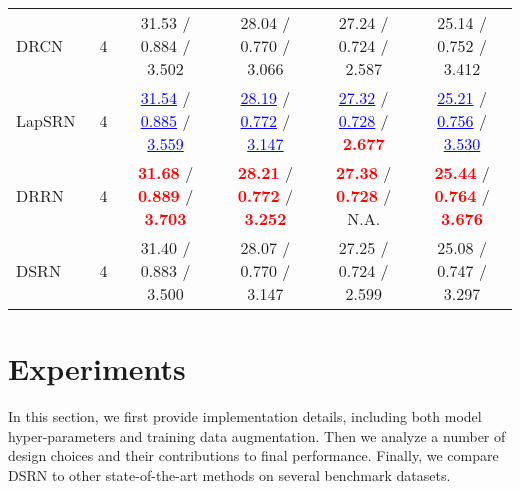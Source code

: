 \documentclass[10pt,twocolumn,letterpaper]{article}
\def\red#1{\textcolor{red}{#1}}
\def\blue#1{\textcolor{blue}{#1}}
\newcommand{\algname}{DSRN }
\begin{document}
\begin{table*}[t]
\begin{tabular}{lccccc}
DRCN~\cite{kim2016deeply}          & 4                      & 31.53 / 0.884 / 3.502                                                          & 28.04 / 0.770 / 3.066                                                          & 27.24 / 0.724 / 2.587                                                      & 25.14 / 0.752 / 3.412                                                          \\
LapSRN~\cite{lai2017deep}          & 4                      & \blue{\underline{31.54}} / \blue{\underline{0.885}} / \blue{\underline{3.559}} & \blue{\underline{28.19}} / \blue{\underline{0.772}} / \blue{\underline{3.147}} & \blue{\underline{27.32}} / \blue{\underline{0.728}} / \red{\textbf{2.677}} & \blue{\underline{25.21}} / \blue{\underline{0.756}} / \blue{\underline{3.530}} \\
DRRN~\cite{tai2017image}           & 4                      & \red{\textbf{31.68}} / \red{\textbf{0.889}} / \red{\textbf{3.703}}             & \red{\textbf{28.21}} / \red{\textbf{0.772}} / \red{\textbf{3.252}}             & \red{\textbf{27.38}} / \red{\textbf{0.728}} / N.A.                         & \red{\textbf{25.44}} / \red{\textbf{0.764}} / \red{\textbf{3.676}}             \\
\algname                           & 4                      & 31.40 / 0.883 / 3.500                                                          & 28.07 / 0.770 / 3.147                                                          & 27.25 / 0.724 / 2.599                                                      & 25.08 / 0.747 / 3.297                                                          \\ \hline
\end{tabular}
\end{table*}

\section{Experiments}
In this section, we first provide implementation details, including both model hyper-parameters and training data augmentation. Then we analyze a number of design choices and their contributions to final performance. Finally, we compare \algname to other state-of-the-art methods on several benchmark datasets. 
\end{document}
